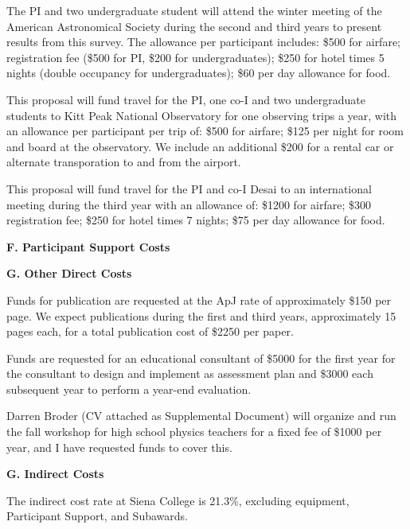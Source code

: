 \documentclass[preprint,11pt]{aastex}
\begin{document}
The PI and
two undergraduate student will attend 
the winter meeting of the American Astronomical
Society during the second and third years to present results from this survey.  
The allowance per participant 
includes: \$500 for airfare; registration fee (\$500 for PI, 
\$200 for undergraduates); \$250 for hotel times 5 nights
(double occupancy for undergraduates); \$60 per day allowance for food.  

This proposal will fund travel for the PI, one co-I and two undergraduate students 
to Kitt Peak National Observatory for one observing trips a year, with an allowance 
per participant per trip of: \$500 for airfare;
\$125 per night for room and board at the observatory.
We include an additional \$200 for a rental car or 
alternate transporation to and from the airport.

This proposal will fund travel for the PI and co-I Desai to an international 
meeting during the third year with an allowance of:
\$1200 for airfare; \$300 registration fee; \$250 for hotel times 7 nights;
\$75 per day allowance for food.

\begin{center}
{\bf \large F. Participant Support Costs}
\end{center}

\begin{center}
{\bf \large G. Other Direct Costs}
\end{center}



Funds for publication are requested at the ApJ rate of approximately \$150 per page.
We expect publications during the first and third years, approximately 15 pages
each, for a total publication cost of \$2250 per paper.


Funds are requested for an educational consultant of  
\$5000 for the first year for the consultant to design
and implement as assessment plan and \$3000 each subsequent year to perform a 
year-end evaluation.

Darren Broder (CV attached as Supplemental 
Document) will organize and run the fall workshop for high school physics teachers
for a fixed fee of \$1000 per year, and I have requested funds to cover
this.




\begin{center}
{\bf \large G. Indirect Costs}
\end{center}

The indirect cost rate at Siena College is 21.3\%, excluding
equipment, Participant Support, and Subawards.  
\end{document}
